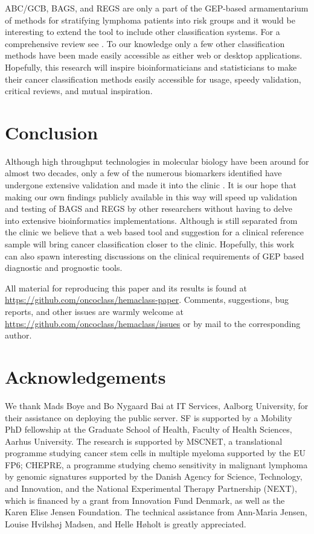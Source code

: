 \documentclass{article}
\begin{document}
ABC/GCB, BAGS, and REGS are only a part of the GEP-based armamentarium of methods for stratifying lymphoma patients into risk groups \citep{Shipp2002, Lossos2004a, Malumbres2008} and it would be interesting to extend the tool to include other classification systems.
For a comprehensive review see \citep{Coutinho2013}.
To our knowledge only a few other classification methods have been made easily accessible as either web or desktop applications.
Hopefully, this research will inspire bioinformaticians and statisticians to make their cancer classification methods easily accessible for usage, speedy validation, critical reviews, and mutual inspiration.

\section{Conclusion}
Although high throughput technologies in molecular biology have been around for almost two decades, only a few of the numerous biomarkers identified have undergone extensive validation and made it into the clinic \citep{Chen2012a}.
It is our hope that making our own findings publicly available in this way will speed up validation and testing of BAGS and REGS by other researchers without having to delve into extensive bioinformatics implementations.
Although \hemaClass{} is still separated from the clinic we believe that a web based tool and suggestion for a clinical reference sample will bring cancer classification closer to the clinic.
Hopefully, this work can also spawn interesting discussions on the clinical requirements of GEP based diagnostic and prognostic tools.

All material for reproducing this paper and its results is found at \url{https://github.com/oncoclass/hemaclass-paper}.
Comments, suggestions, bug reports, and other issues are warmly welcome at \url{https://github.com/oncoclass/hemaclass/issues} or by mail to the corresponding author.

{}
\section*{Acknowledgements}
We thank Mads Boye and Bo Nygaard Bai at IT Services, Aalborg University, for their assistance on deploying the public server.
SF is supported by a Mobility PhD fellowship at the Graduate School of Health, Faculty of Health Sciences, Aarhus University.
The research is supported by MSCNET, a translational programme studying cancer stem cells in multiple myeloma supported by the EU FP6; CHEPRE, a programme studying chemo sensitivity in malignant lymphoma by genomic signatures supported by the Danish Agency for Science, Technology, and Innovation, and the National Experimental Therapy Partnership (NEXT), which is financed by a grant from Innovation Fund Denmark, as well as the Karen Elise Jensen Foundation.
The technical assistance from Ann-Maria Jensen, Louise Hvilsh{\o}j Madsen, and Helle H{\o}holt is greatly appreciated.
\end{document}
